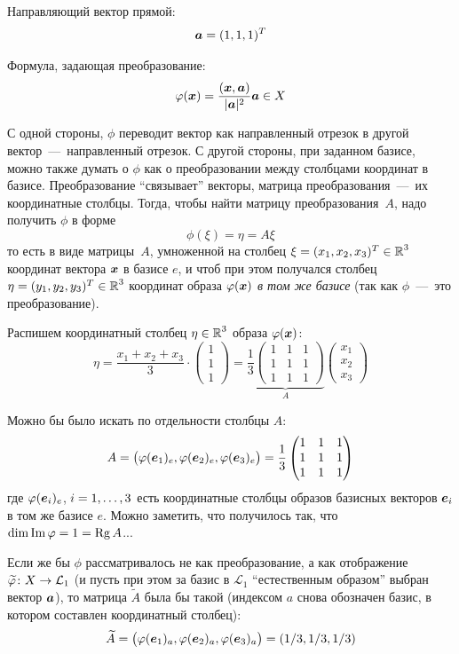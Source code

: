 \documentclass[a4paper,12pt]{article}
\DeclareMathOperator{\Imag}{Im}
\begin{document}
  \begin{solution}
    Направляющий вектор прямой:
    \[
      \boldsymbol a = (1, 1, 1)^T
    \]
    
    Формула, задающая преобразование:
    \[
      \varphi(\boldsymbol x) = \frac{(\boldsymbol x, \boldsymbol a)}{|\boldsymbol a|^2} \boldsymbol a \in X
    \]
    
    С одной стороны, $\phi$ переводит вектор как направленный отрезок в другой вектор~---~направленный отрезок.
    С другой стороны, при заданном базисе, можно также думать о $\phi$ как о преобразовании между столбцами координат в базисе.
    Преобразование ``связывает'' векторы, матрица преобразования~---~их координатные столбцы.
    Тогда, чтобы найти матрицу преобразования~$A$, надо получить $\phi$ в форме
    \[
      \phi(\xi) = \eta = A \xi
    \]
    то есть в виде матрицы~$A$, умноженной на столбец $\xi \hm= (x_1, x_2, x_3)^T \hm\in \RR^3$ координат вектора $\boldsymbol x$ в базисе $e$, и чтоб при этом получался столбец $\eta \hm= (y_1, y_2, y_3)^T \hm\in \RR^3$ координат образа $\varphi(\boldsymbol x)$ \emph{в том же базисе} (так как $\phi$~---~это преобразование).
    
    Распишем координатный столбец $\eta \hm\in \RR^3$ образа $\varphi(\boldsymbol x)$:
    \[
      \eta = \frac{x_1 + x_2 + x_3}{3} \cdot \begin{pmatrix} 1 \\ 1 \\ 1 \end{pmatrix}
      = \underbrace{\frac{1}{3}\begin{pmatrix}
        1 & 1 & 1\\
        1 & 1 & 1\\
        1 & 1 & 1
      \end{pmatrix}}_{A} \begin{pmatrix}
        x_1 \\ x_2 \\ x_3
      \end{pmatrix}
    \]
    
    Можно бы было искать по отдельности столбцы $A$:
    \[
      A = \bigl(\varphi(\boldsymbol e_1)_e, \varphi(\boldsymbol e_2)_e, \varphi(\boldsymbol e_3)_e\bigr) = \frac{1}{3}\begin{pmatrix}
        1 & 1 & 1\\
        1 & 1 & 1\\
        1 & 1 & 1
      \end{pmatrix}
    \]
    где $\varphi(\boldsymbol e_i)_e$, $i \hm= 1, \ldots, 3$ есть координатные столбцы образов базисных векторов $\boldsymbol e_i$ в том же базисе $e$.
    Можно заметить, что получилось так, что $\dim \Imag \phi \hm= 1 \hm= \Rg A$...
    
    Если же бы $\phi$ рассматривалось не как преобразование, а как отображение $\widetilde \phi\colon X \hm\to \mathcal L_1$ (и пусть при этом за базис в $\mathcal L_1$ ``естественным образом'' выбран вектор $\boldsymbol a$), то матрица $\widetilde A$ была бы такой (индексом $a$ снова обозначен базис, в котором составлен координатный столбец):
    \[
      \widetilde A \hm= \bigl(\phi(\bds e_1)_a, \phi(\bds e_2)_a, \phi(\bds e_3)_a\bigr) \hm= (1/3, 1/3, 1/3)
    \]
  \end{solution}
  
\end{document}
